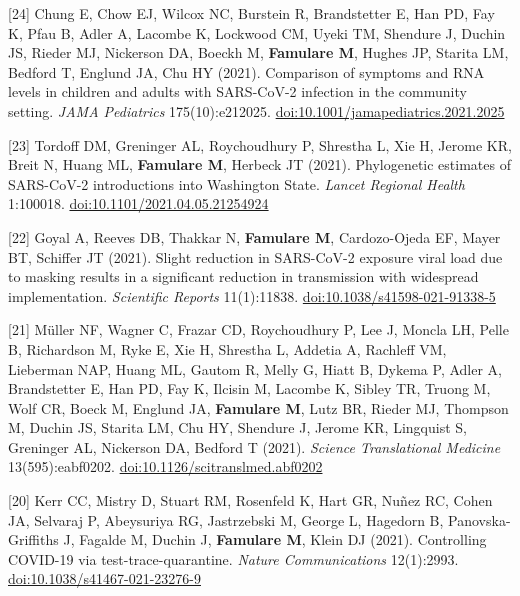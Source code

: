 \documentclass{article}
\begin{document}
\begin{llist}
\begin{items}
\item[{[24]}] Chung E, Chow EJ, Wilcox NC, Burstein R, Brandstetter E, Han PD, Fay K, Pfau B, Adler A, Lacombe K, Lockwood CM, Uyeki TM, Shendure J, Duchin JS, Rieder MJ, Nickerson DA, Boeckh M, \textbf{Famulare M}, Hughes JP, Starita LM, Bedford T, Englund JA, Chu HY (2021). Comparison of symptoms and RNA levels in children and adults with SARS-CoV-2 infection in the community setting. \emph{JAMA Pediatrics} 175(10):e212025. \href{https://doi.org/10.1001/jamapediatrics.2021.2025}{doi:10.1001/jamapediatrics.2021.2025}

\item[{[23]}] Tordoff DM, Greninger AL, Roychoudhury P, Shrestha L, Xie H, Jerome KR, Breit N, Huang ML, \textbf{Famulare M}, Herbeck JT (2021). Phylogenetic estimates of SARS-CoV-2 introductions into Washington State. \emph{Lancet Regional Health} 1:100018. \href{https://doi.org/10.1101/2021.04.05.21254924}{doi:10.1101/2021.04.05.21254924}

\item[{[22]}] Goyal A, Reeves DB, Thakkar N, \textbf{Famulare M}, Cardozo-Ojeda EF, Mayer BT, Schiffer JT (2021). Slight reduction in SARS-CoV-2 exposure viral load due to masking results in a significant reduction in transmission with widespread implementation. \emph{Scientific Reports} 11(1):11838. \href{https://doi.org/10.1038/s41598-021-91338-5}{doi:10.1038/s41598-021-91338-5}

\item[{[21]}] M\"uller NF, Wagner C, Frazar CD, Roychoudhury P, Lee J, Moncla LH, Pelle B, Richardson M, Ryke E, Xie H, Shrestha L, Addetia A, Rachleff VM, Lieberman NAP, Huang ML, Gautom R, Melly G, Hiatt B, Dykema P, Adler A, Brandstetter E, Han PD, Fay K, Ilcisin M, Lacombe K, Sibley TR, Truong M, Wolf CR, Boeck M, Englund JA, \textbf{Famulare M}, Lutz BR, Rieder MJ, Thompson M, Duchin JS, Starita LM, Chu HY, Shendure J, Jerome KR, Lingquist S, Greninger AL, Nickerson DA, Bedford T (2021). \emph{Science Translational Medicine} 13(595):eabf0202. \href{https://doi.org/10.1126/scitranslmed.abf0202}{doi:10.1126/scitranslmed.abf0202}

\item[{[20]}] Kerr CC, Mistry D, Stuart RM, Rosenfeld K, Hart GR, Nu\~nez RC, Cohen JA, Selvaraj P, Abeysuriya RG, Jastrzebski M, George L, Hagedorn B, Panovska-Griffiths J, Fagalde M, Duchin J, \textbf{Famulare M}, Klein DJ (2021). Controlling COVID-19 via test-trace-quarantine. \emph{Nature Communications} 12(1):2993. \href{https://doi.org/10.1038/s41467-021-23276-9}{doi:10.1038/s41467-021-23276-9}


\end{items}
\end{llist}
\end{document}
